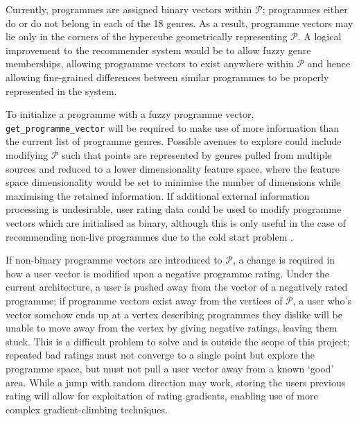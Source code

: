 		Currently, programmes are assigned binary vectors within $\mathcal{P}$; programmes either do or do not belong in each of the 18 genres. As a result, programme vectors may lie only in the corners of the hypercube geometrically representing $\mathcal{P}$. A logical improvement to the recommender system would be to allow fuzzy genre memberships, allowing programme vectors to exist anywhere within $\mathcal{P}$ and hence allowing fine-grained differences between similar programmes to be properly represented in the system.
		
		To initialize a programme with a fuzzy programme vector, \texttt{get\_programme\_vector} will be required to make use of more information than the current list of programme genres. Possible avenues to explore could include modifying $\mathcal{P}$ such that points are represented by genres pulled from multiple sources and reduced to a lower dimensionality feature space, where the feature space dimensionality would be set to minimise the number of dimensions while maximising the retained information. If additional external information processing is undesirable, user rating data could be used to modify programme vectors which are initialised as binary, although this is only useful in the case of recommending non-live programmes due to the cold start problem \citep{cold-start-problem}.

		If non-binary programme vectors are introduced to $\mathcal{P}$, a change is required in how a user vector is modified upon a negative programme rating. Under the current architecture, a user is pushed away from the vector of a negatively rated programme; if programme vectors exist away from the vertices of $\mathcal{P}$, a user who's vector somehow ends up at a vertex describing programmes they dislike will be unable to move away from the vertex by giving negative ratings, leaving them stuck. This is a difficult problem to solve and is outside the scope of this project; repeated bad ratings must not converge to a single point but explore the programme space, but must not pull a user vector away from a known `good' area. While a jump with random direction may work, storing the users previous rating will allow for exploitation of rating gradients, enabling use of more complex gradient-climbing techniques.

